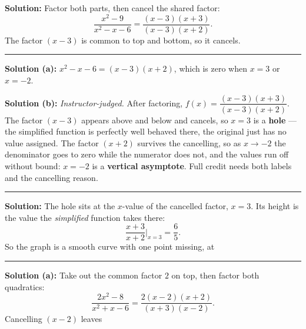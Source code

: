 \documentclass[12pt]{article}
\begin{document}



\textbf{Solution:} Factor both parts, then cancel the shared factor:
\[ \frac{x^2-9}{x^2-x-6} = \frac{(x-3)(x+3)}{(x-3)(x+2)} . \]
The factor $(x-3)$ is common to top and bottom, so it cancels.

\vspace{0.25cm}\noindent\rule{\linewidth}{0.2pt}\vspace{0.25cm}


\textbf{Solution (a):} $x^2 - x - 6 = (x-3)(x+2)$, which is zero when
$x = 3$ or $x = -2$. 

\textbf{Solution (b):} \emph{Instructor-judged.} After factoring,
$f(x) = \dfrac{(x-3)(x+3)}{(x-3)(x+2)}$. The factor $(x-3)$ appears above and
below and cancels, so $x = 3$ is a \textbf{hole} --- the simplified function is
perfectly well behaved there, the original just has no value assigned. The
factor $(x+2)$ survives the cancelling, so as $x \to -2$ the denominator goes to
zero while the numerator does not, and the values run off without bound:
$x = -2$ is a \textbf{vertical asymptote}. Full credit needs both labels and the
cancelling reason.

\vspace{0.25cm}\noindent\rule{\linewidth}{0.2pt}\vspace{0.25cm}


\textbf{Solution:} The hole sits at the $x$-value of the cancelled factor,
$x = 3$. Its height is the value the \emph{simplified} function takes there:
\[ \frac{x+3}{x+2} \Big|_{x=3} = \frac{6}{5} . \]
So the graph is a smooth curve with one point missing, at

\vspace{0.25cm}\noindent\rule{\linewidth}{0.2pt}\vspace{0.25cm}


\textbf{Solution (a):} Take out the common factor $2$ on top, then factor both
quadratics:
\[ \frac{2x^2-8}{x^2+x-6} = \frac{2(x-2)(x+2)}{(x+3)(x-2)} . \]
Cancelling $(x-2)$ leaves 
\end{document}
